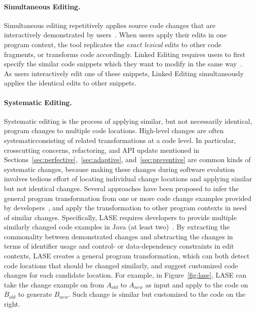 \paragraph{Simultaneous Editing.}
Simultaneous editing repetitively applies source code changes that are interactively demonstrated by users~\cite{MiM2001}. When users apply their edits in one program context, the tool replicates the \emph{exact lexical} edits to other code fragments, or transforms code accordingly. Linked Editing requires users to first specify the similar code snippets which they want to modify in the same way~\cite{TBG2004}. As users interactively edit one of these snippets, Linked Editing simultaneously applies the identical edits to other snippets. 

\paragraph{Systematic Editing.} Systematic editing is the process of applying similar, but not necessarily identical, program changes to multiple code locations. High-level changes are often systematic\textemdash consisting of related transformations at a code level. In particular, crosscutting concerns, refactoring, and API update mentioned in Sections~\ref{sec:perfective},~\ref{sec:adaptive}, and~\ref{sec:preventive} are common kinds of systematic changes, because making these changes during software evolution involves tedious effort of locating individual change locations and applying similar but not identical changes. Several approaches have been proposed to infer the general program transformation from one or more code change examples provided by developers~\cite{MKM2011,Meng12:lase,Rolim:2017}, and apply the transformation to other program contexts in need of similar changes. Specifically, LASE requires developers to provide multiple similarly changed code examples in Java (at least two)~\cite{Meng12:lase}. By extracting the commonality between demonstrated changes and abstracting the changes in terms of identifier usage and control- or data-dependency constraints in edit contexts, LASE creates a general program transformation, which can both detect code locations that should be changed similarly, and suggest customized code changes for each candidate location. For example, in Figure~\ref{fig:lase}, LASE can take the change example on from $A_{old}$ to $A_{new}$ as input and apply to the code on $B_{old}$ to generate $B_{new}$. Such change is similar but customized to the code on the right. 

